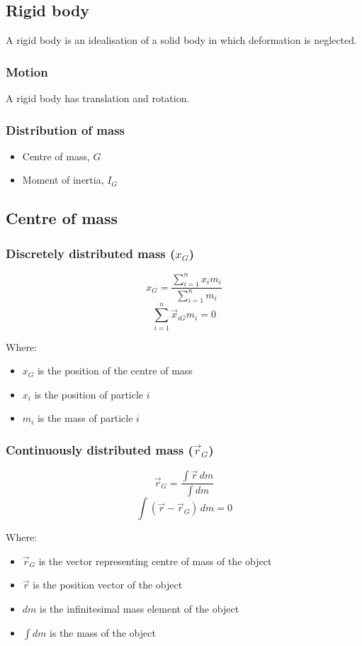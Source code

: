 \documentclass[11pt]{article}
\begin{document}
\subsection{Rigid body}
\label{sec:orgc60d4c1}
A rigid body is an idealisation of a solid body in which deformation is neglected.
\subsubsection{Motion}
\label{sec:orgb4eb559}
A rigid body has translation and rotation.
\subsubsection{Distribution of mass}
\label{sec:org779b813}
\begin{itemize}
\item Centre of mass, \(G\)
\item Moment of inertia, \(I_G\)
\end{itemize}
\subsection{Centre of mass}
\label{sec:org10cb5a8}

\subsubsection{Discretely distributed mass (\(x_G\))}
\label{sec:orge421004}
\[x_G = \frac{\sum_{i = 1}^n x_i m_i}{\sum_{i = 1}^n m_i}\]
\[\sum_{i = 1}^n \vec{x}_{iG} m_i = 0\]

Where:
\begin{itemize}
\item \(x_G\) is the position of the centre of mass
\item \(x_i\) is the position of particle \(i\)
\item \(m_i\) is the mass of particle \(i\)
\end{itemize}
\subsubsection{Continuously distributed mass (\(\vec{r}_G\))}
\label{sec:org6e06535}
\[\vec{r}_G = \frac{\int \vec{r} \, dm}{\int dm}\]
\[\int (\vec{r} - \vec{r}_G) \, dm = 0\]

Where:
\begin{itemize}
\item \(\vec{r}_G\) is the vector representing centre of mass of the object
\item \(\vec{r}\) is the position vector of the object
\item \(dm\) is the infinitesimal mass element of the object
\item \(\int dm\) is the mass of the object
\end{itemize}
\end{document}
